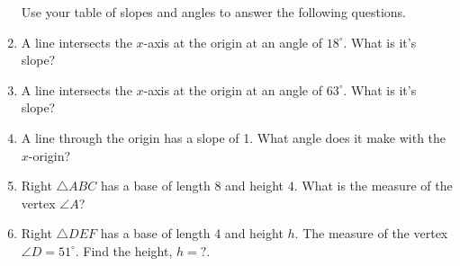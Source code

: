 \documentclass[12pt, twoside]{article}
\begin{document}
\begin{enumerate}
\newpage
Use your table of slopes and angles to answer the following questions. 
  \item A line intersects the $x$-axis at the origin at an angle of $18^\circ$. What is it's slope? \vspace{1cm}
  \item A line intersects the $x$-axis at the origin at an angle of $63^\circ$. What is it's slope? \vspace{1cm}
  \item A line through the origin has a slope of 1. What angle does it make with the $x$-origin? \vspace{1cm}
  \item Right $\triangle ABC$ has a base of length 8 and height 4. What is the measure of the vertex $\angle A$?
    \begin{flushright}
    \end{flushright} 

    \item Right $\triangle DEF$ has a base of length 4 and height $h$. The measure of the vertex $\angle D = 51^\circ$. Find the height, $h=?$.
    \begin{flushright}
    \end{flushright}

\end{enumerate}
\end{document}
